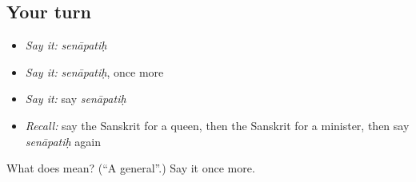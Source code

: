 \subsection*{Your turn}
\begin{itemize}
\raggedright
  \item \emph{Say it:} \emph{senāpatiḥ}
  \item \emph{Say it:} \emph{senāpatiḥ}, once more
  \item \emph{Say it:} say \emph{senāpatiḥ}
  \item \emph{Recall:} say the Sanskrit for a queen, then the Sanskrit for a minister, then say \emph{senāpatiḥ} again
\end{itemize}

\begin{tcolorbox}[breakable,colback=teal!4,colframe=teal!35!black,title={Before you move on}]
What does  mean? (\textquotedblleft{}A general\textquotedblright{}.) Say it once more.
\end{tcolorbox}
